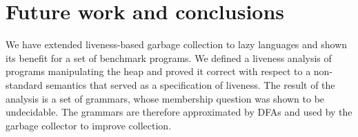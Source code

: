 \documentclass[9pt]{sigplanconf}
\begin{document}
\vskip -5mm
\section{Future work and conclusions}
\label{sec:conclusion}



We have  extended liveness-based  garbage collection  to lazy
  languages  and shown  its benefit  for a  set of  benchmark
  programs.  We  defined a liveness analysis  of programs manipulating
  the  heap and  proved  it  correct with  respect  to a  non-standard
  semantics that served as a specification of liveness.  The result of
  the analysis  is a  set of grammars,  whose membership  question was
  shown to be undecidable. The  grammars are therefore approximated by
  DFAs and used by the garbage collector to improve collection.
\end{document}
